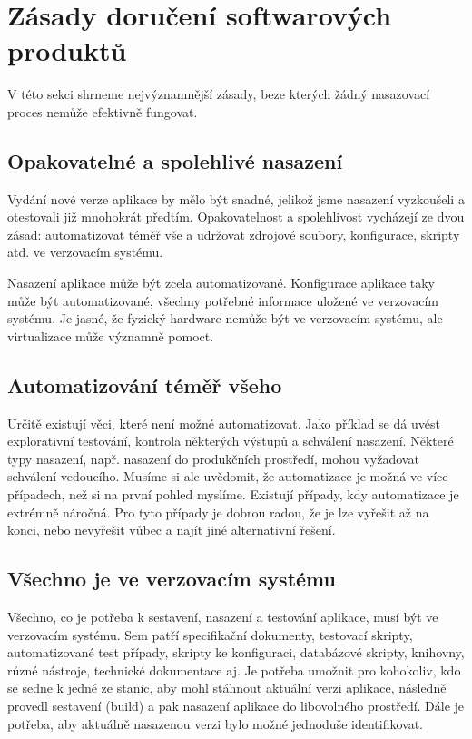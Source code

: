 \section{Zásady doručení softwarových produktů}
V této sekci shrneme nejvýznamnější zásady, beze kterých žádný nasazovací proces nemůže efektivně fungovat. 

\subsection{Opakovatelné a spolehlivé nasazení}
Vydání nové verze aplikace by mělo být snadné, jelikož jsme nasazení vyzkoušeli a otestovali již mnohokrát předtím. Opakovatelnost a spolehlivost vycházejí ze dvou zásad: automatizovat téměř vše a udržovat zdrojové soubory, konfigurace, skripty atd. ve verzovacím systému.

Nasazení aplikace může být zcela automatizované. Konfigurace aplikace taky může být automatizované, všechny potřebné informace uložené ve verzovacím systému. Je jasné, že fyzický hardware nemůže být ve verzovacím systému, ale virtualizace může významně pomoct.

\subsection{Automatizování téměř všeho}
Určitě existují věci, které není možné automatizovat. Jako příklad se dá uvést explorativní testování, kontrola některých výstupů a schválení nasazení. Některé typy nasazení, např. nasazení do produkčních prostředí, mohou vyžadovat schválení vedoucího. Musíme si ale uvědomit, že automatizace je možná ve více případech, než si na první pohled myslíme. Existují případy, kdy automatizace je extrémně náročná. Pro tyto případy je dobrou radou, že je lze vyřešit až na konci, nebo nevyřešit vůbec a najít jiné alternativní řešení. 

\subsection{Všechno je ve verzovacím systému}
Všechno, co je potřeba k sestavení, nasazení a testování aplikace, musí být ve verzovacím systému. Sem patří specifikační dokumenty, testovací skripty, automatizované test případy, skripty ke konfiguraci, databázové skripty, knihovny, různé nástroje, technické dokumentace aj.
Je potřeba umožnit pro kohokoliv, kdo se sedne k jedné ze stanic, aby mohl stáhnout aktuální verzi aplikace, následně provedl sestavení (build) a pak nasazení aplikace do libovolného prostředí. Dále je potřeba, aby aktuálně nasazenou verzi bylo možné jednoduše identifikovat.

